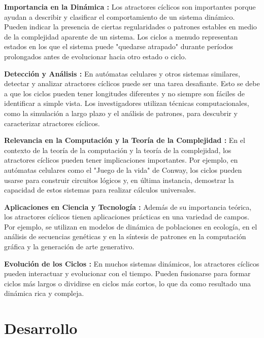 \documentclass{article}
\begin{document}
	\textbf{Importancia en la Dinámica :} Los atractores cíclicos son importantes porque ayudan a describir y clasificar el comportamiento de un sistema dinámico. Pueden indicar la presencia de ciertas regularidades o patrones estables en medio de la complejidad aparente de un sistema. Los ciclos a menudo representan estados en los que el sistema puede "quedarse atrapado" durante períodos prolongados antes de evolucionar hacia otro estado o ciclo.
	
	\textbf{Detección y Análisis :} En autómatas celulares y otros sistemas similares, detectar y analizar atractores cíclicos puede ser una tarea desafiante. Esto se debe a que los ciclos pueden tener longitudes diferentes y no siempre son fáciles de identificar a simple vista. Los investigadores utilizan técnicas computacionales, como la simulación a largo plazo y el análisis de patrones, para descubrir y caracterizar atractores cíclicos.
	
	\textbf{Relevancia en la Computación y la Teoría de la Complejidad :} En el contexto de la teoría de la computación y la teoría de la complejidad, los atractores cíclicos pueden tener implicaciones importantes. Por ejemplo, en autómatas celulares como el "Juego de la vida" de Conway, los ciclos pueden usarse para construir circuitos lógicos y, en última instancia, demostrar la capacidad de estos sistemas para realizar cálculos universales.
	
	\textbf{Aplicaciones en Ciencia y Tecnología :} Además de su importancia teórica, los atractores cíclicos tienen aplicaciones prácticas en una variedad de campos. Por ejemplo, se utilizan en modelos de dinámica de poblaciones en ecología, en el análisis de secuencias genéticas y en la síntesis de patrones en la computación gráfica y la generación de arte generativo.
	
	\textbf{Evolución de los Ciclos :} En muchos sistemas dinámicos, los atractores cíclicos pueden interactuar y evolucionar con el tiempo. Pueden fusionarse para formar ciclos más largos o dividirse en ciclos más cortos, lo que da como resultado una dinámica rica y compleja.
	
	
	\renewcommand{\cftsecfont}{\bfseries}
	\renewcommand{\cftsubsecfont}{\normalfont}
	\renewcommand{\cftsecleader}{\cftdotfill{\cftdotsep}}
	\renewcommand{\cftsubsecleader}{\cftdotfill{\cftdotsep}}
	
	\section{Desarrollo}
	
\end{document}
